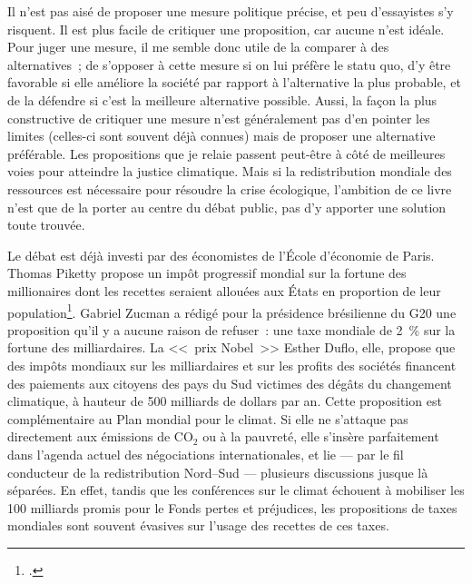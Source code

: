 \documentclass[a5paper,french,openany]{memoir}
\begin{document}
Il n'est pas aisé de proposer une mesure politique précise, et peu d'essayistes s'y risquent. Il est plus facile de critiquer une proposition, car aucune n'est idéale. Pour juger une mesure, il me semble donc utile de la comparer à des alternatives~; de s'opposer à cette mesure si on lui préfère le statu quo, d'y être favorable si elle améliore la société par rapport à l'alternative la plus probable, et de la défendre si c'est la meilleure alternative possible. Aussi, la façon la plus constructive de critiquer une mesure n'est généralement pas d'en pointer les limites (celles-ci sont souvent déjà connues) mais de proposer une alternative préférable. 
Les propositions que je relaie %
passent peut-être 
à côté de meilleures voies pour atteindre la justice climatique. %
Mais si la redistribution mondiale des ressources est nécessaire pour résoudre la crise écologique, l'ambition de ce livre n'est que de la porter au centre du débat public, %
pas d'y apporter une solution toute trouvée. 

Le débat est déjà investi par des économistes de l'École d'économie de Paris. Thomas Piketty propose un impôt progressif mondial sur la fortune des millionaires dont les recettes seraient allouées aux États en proportion de leur population\footnote{\citet{piketty_breve_2021}.}. 
Gabriel Zucman a rédigé pour la présidence brésilienne du G20 une proposition qu'il y a aucune raison de refuser~: une taxe mondiale de 2~\% sur la fortune des milliardaires. %
La <<~prix Nobel~>> Esther Duflo, elle, propose que des impôts mondiaux sur les milliardaires et sur les profits des sociétés financent des paiements aux citoyens des pays du Sud victimes des dégâts du changement climatique, à hauteur de 500 milliards de dollars par an. Cette proposition est complémentaire au Plan mondial pour le climat. Si elle ne s'attaque pas directement aux émissions de CO$_\text{2}$ ou à la pauvreté, elle s'insère parfaitement dans l'agenda actuel des négociations internationales, et lie --- par le fil conducteur de la redistribution Nord--Sud --- plusieurs discussions jusque là séparées. En effet, tandis que les conférences sur le climat échouent à mobiliser les 100 milliards promis pour le Fonds pertes et préjudices, les propositions de taxes mondiales sont souvent évasives sur l'usage des recettes de ces taxes. 
\end{document}
